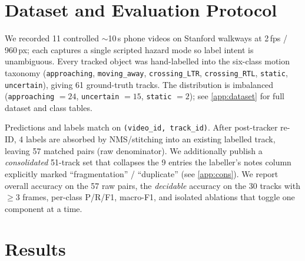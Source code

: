 \documentclass[10pt,twocolumn,letterpaper]{article}
\begin{document}
\section{Dataset and Evaluation Protocol}
\label{sec:dataset}

We recorded 11 controlled $\sim$10\,s phone videos on Stanford
walkways at 2\,fps / 960\,px; each captures a single scripted hazard
mode so label intent is unambiguous. Every tracked object was
hand-labelled into the six-class motion taxonomy
(\texttt{approaching}, \texttt{moving\_away},
\texttt{crossing\_LTR}, \texttt{crossing\_RTL}, \texttt{static},
\texttt{uncertain}), giving 61 ground-truth tracks. The distribution
is imbalanced (\texttt{approaching} $=\!24$, \texttt{uncertain}
$=\!15$, \texttt{static} $=\!2$); see \cref{app:dataset} for full
dataset and class tables.

Predictions and labels match on \texttt{(video\_id, track\_id)}. After
post-tracker re-ID, 4 labels are absorbed by NMS/stitching into an
existing labelled track, leaving 57 matched pairs (raw denominator).
We additionally publish a \emph{consolidated} 51-track set that
collapses the 9 entries the labeller's notes column explicitly
marked ``fragmentation'' / ``duplicate'' (see \cref{app:cons}). We
report overall accuracy on the 57 raw pairs, the \emph{decidable}
accuracy on the 30 tracks with $\ge\!3$ frames, per-class P/R/F1,
macro-F1, and isolated ablations that toggle one component at a time.

\section{Results}
\label{sec:results}

\begin{table}[t]
  \centering\scriptsize
  \caption{Per-class P/R/F1 (raw 57-track denominator). Macro-F1
  0.67 is depressed by rare classes with $n\!\le\!3$.}
  \label{tab:perclass}
  \resizebox{\linewidth}{!}{}
\end{table}
\end{document}
